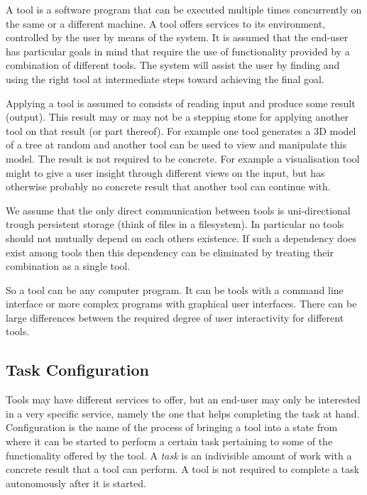 \documentclass{article}
\begin{document}
   A tool is a software program that can be executed multiple times
   concurrently on the same or a different machine.  A tool offers services to
   its environment, controlled by the user by means of the system. It is
   assumed that the end-user has particular goals in mind that require the use
   of functionality provided by a combination of different tools. The system
   will assist the user by finding and using the right tool at intermediate
   steps toward achieving the final goal.

   Applying a tool is assumed to consists of reading input and produce some
   result (output).  This result may or may not be a stepping stone for
   applying another tool on that result (or part thereof).  For example one
   tool generates a 3D model of a tree at random and another tool can be used
   to view and manipulate this model. The result is not required to be
   concrete. For example a visualisation tool might to give a user insight
   through different views on the input, but has otherwise probably no concrete
   result that another tool can continue with.
   
   We assume that the only direct communication between tools is
   uni-directional trough persistent storage (think of files in a filesystem).
   In particular no tools should not mutually depend on each others existence.
   If such a dependency does exist among tools then this dependency can be
   eliminated by treating their combination as a single tool.

   So a tool can be any computer program. It can be tools with a command line
   interface or more complex programs with graphical user interfaces.  There
   can be large differences between the required degree of user interactivity
   for different tools.

  \subsection{Task Configuration}

   Tools may have different services to offer, but an end-user may only be
   interested in a very specific service, namely the one that helps completing
   the task at hand. Configuration is the name of the process of bringing a
   tool into a state from where it can be started to perform a certain task
   pertaining to some of the functionality offered by the tool. A \textit{task}
   is an indivisible amount of work with a concrete result that a tool can
   perform.  A tool is not required to complete a task autonomously after it is
   started.
   
\end{document}
